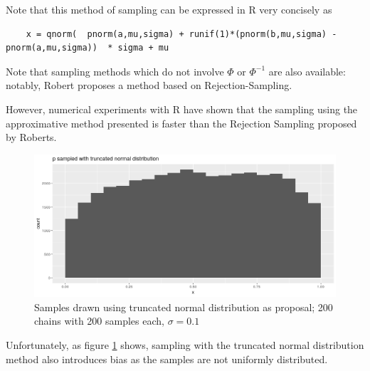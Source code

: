 Note that this method of sampling can be expressed in R very concisely as 
\begin{verbatim}
	x = qnorm(  pnorm(a,mu,sigma) + runif(1)*(pnorm(b,mu,sigma) - pnorm(a,mu,sigma))  * sigma + mu
\end{verbatim}

Note that sampling methods which do not involve $\Phi$ or $\Phi^{-1}$ are also available: notably, Robert\cite{Robert95simulationof} proposes a method based on Rejection-Sampling.
\vspace{0.5cm}


However, numerical experiments with R have shown that the sampling using the approximative method presented is faster than the Rejection Sampling proposed by Roberts. 


\begin{figure}
	\includegraphics[width=\linewidth]{img/truncatedNormalAlsoBiased.png}
	\caption{Samples drawn using truncated normal distribution as proposal; 200 chains with 200 samples each, $\sigma = 0.1$}
	\label{fig:truncatedAlsoBiased}
\end{figure}
 
 Unfortunately, as figure \ref{fig:truncatedAlsoBiased} shows, sampling with the truncated normal distribution method also introduces bias as the samples are not uniformly distributed. 



